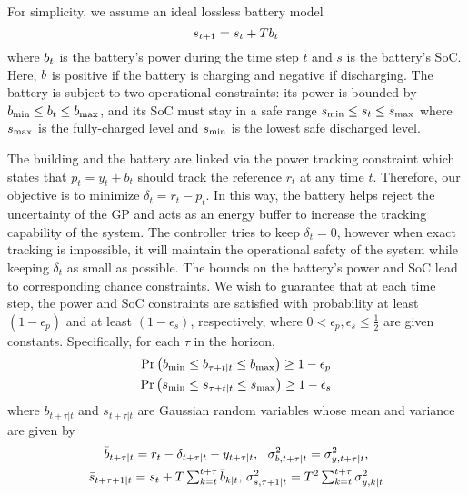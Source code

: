 For simplicity, we assume an ideal lossless battery model
\begin{equation}
\label{eq:battery-model}
s_{t+1} = s_t + T \Pbatt_t
\end{equation}
where \(b_t\) is the battery's power during the time step \(t\) and \(s\) is the battery's SoC.
Here, \(b\) is positive if the battery is charging and negative if discharging.
The battery is subject to two operational constraints:
its power is bounded by \(b_{\mathrm{min}} \leq b_t \leq b_{\mathrm{max}}\), 
and its SoC must stay in a safe range \(s_{\mathrm{min}} \leq s_t \leq s_{\mathrm{max}}\) where \(s_{\mathrm{max}}\) is the fully-charged level and \(s_{\mathrm{min}}\) is the lowest safe discharged level. 

The building and the battery are linked via the power tracking constraint which states that \(p_t = y_t + b_t\) should track the reference \(r_t\) at any time \(t\). Therefore, our objective is to minimize \(\delta_t = r_t - p_t\).
In this way, the battery helps reject the uncertainty of the GP and acts as an energy buffer to increase the tracking capability of the system. 
The controller tries to keep \(\delta_t = 0\), however when exact tracking is impossible, it will maintain the operational safety of the system while keeping \(\delta_t\)  as small as possible.
The bounds on the battery's power and SoC lead to corresponding chance constraints.
We wish to guarantee that at each time step, the power and SoC constraints are satisfied with probability at least \((1 - \epsilon_p)\) and  at least \((1 - \epsilon_s)\), respectively, where \(0 < \epsilon_p, \epsilon_s \leq \frac{1}{2}\) are given constants.
Specifically, for each \(\tau\) in the horizon,
	\begin{gather}
	\label{E:battery_chance}
	\Pr\left( \Pbmin \leq b_{\tau+t|t}\leq \Pbmax \right) \geq 1 - \epsilon_p  \\
	\label{E:SoC_chance}
	\Pr\left( \SOCmin \leq s_{\tau+t|t} \leq \SOCmax \right) \geq 1 - \epsilon_s 
	\end{gather}
where \(b_{t+\tau|t}\) and \(s_{t+\tau|t}\) are Gaussian random variables whose mean and variance are given by
\begin{gather}
\label{E:battery_dist}
\bar{b}_{t+\tau|t}= r_{t} - \delta_{t+\tau|t} - \bar{y}_{t+\tau|t}, \ \ 
\sigma^2_{b,t+\tau|t} =  \sigma^2_{y,t+\tau|t} \text, \\
\label{E:SoC_dist}
\bar{s}_{t+\tau+1|t}= s_t + T \textstyle\sum_{k=t}^{t+\tau} \predict{k}{\bar{\Pbatt}}, \,
\predict{s,\tau+1}{\sigma^2} = T^2 \textstyle\sum_{k=t}^{t+\tau} \predict{y,k}{\sigma^2}
\end{gather}
